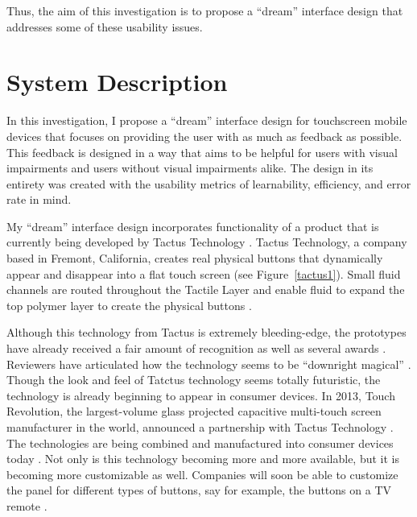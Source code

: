 \documentclass[11pt]{article}
\begin{document}
Thus, the aim of this investigation is to propose a ``dream'' interface design that addresses some of these usability issues.


\section{System Description}
\label{System Description}

In this investigation, I propose a ``dream'' interface design for touchscreen mobile devices that focuses on providing the user with as much as feedback as possible. This feedback is designed in a way that aims to be helpful for users with visual impairments and users without visual impairments alike. The design in its entirety was created with the usability metrics of learnability, efficiency, and error rate in mind.

My ``dream'' interface design incorporates functionality of a product that is currently being developed by Tactus Technology \cite{Tactus}. Tactus Technology, a company based in Fremont, California, creates real physical buttons that dynamically appear and disappear into a flat touch screen (see Figure~\ref{tactus1}). Small fluid channels are routed throughout the Tactile Layer and enable fluid to expand the top polymer layer to create the physical buttons \cite{Tactus}.

Although this technology from Tactus is extremely bleeding-edge, the prototypes have already received a fair amount of recognition as well as several awards \cite{CNN, I-Zone, PCMag, Wired}. Reviewers have articulated how the technology seems to be ``downright magical'' \cite{CNN}. Though the look and feel of Tatctus technology seems totally futuristic, the technology is already beginning to appear in consumer devices. In 2013, Touch Revolution, the largest-volume glass projected capacitive multi-touch screen manufacturer in the world, announced a partnership with Tactus Technology \cite{TactusAvailability}. The technologies are being combined and manufactured into consumer devices today \cite{TactusAvailability}. Not only is this technology becoming more and more available, but it is becoming more customizable as well. Companies will soon be able to customize the panel for different types of buttons, say for example, the buttons on a TV remote \cite{CNN}.
\end{document}
